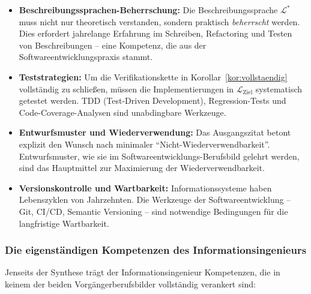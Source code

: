 ﻿\documentclass[a4paper,12pt]{article}
\theoremstyle{definition}
\begin{document}
\begin{itemize}
  \item \textbf{Beschreibungssprachen-Beherrschung:}
        Die Beschreibungssprache $\mathcal{L}^*$ muss nicht nur theoretisch
        verstanden, sondern praktisch \emph{beherrscht} werden. Dies erfordert
        jahrelange Erfahrung im Schreiben, Refactoring und Testen von Beschreibungen --
        eine Kompetenz, die aus der Softwareentwicklungspraxis stammt.
  \item \textbf{Teststrategien:}
        Um die Verifikationskette in Korollar~\ref{kor:vollstaendig} vollständig
        zu schließen, müssen die Implementierungen in $\mathcal{L}_{\text{Ziel}}$
        systematisch getestet werden. TDD (Test-Driven Development), Regression-Tests
        und Code-Coverage-Analysen sind unabdingbare Werkzeuge.
  \item \textbf{Entwurfsmuster und Wiederverwendung:}
        Das Ausgangszitat betont explizit den Wunsch nach minimaler
        \enquote{Nicht-Wiederverwendbarkeit}. Entwurfsmuster, wie sie im
        Softwareentwicklungs-Berufsbild gelehrt werden, sind das Hauptmittel zur
        Maximierung der Wiederverwendbarkeit.
  \item \textbf{Versionskontrolle und Wartbarkeit:}
        Informationssysteme haben Lebenszyklen von Jahrzehnten. Die Werkzeuge der
        Softwareentwicklung -- Git, CI/CD, Semantic Versioning -- sind notwendige
        Bedingungen für die langfristige Wartbarkeit.
\end{itemize}

\subsubsection{Die eigenständigen Kompetenzen des Informationsingenieurs}

Jenseits der Synthese trägt der Informationsingenieur Kompetenzen, die in keinem der
beiden Vorgängerberufsbilder vollständig verankert sind:
\end{document}

